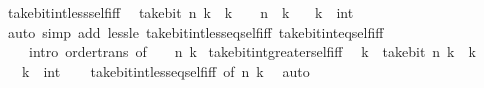 \begin{isabellebody}
\isamarkupfalse%
%
\endisatagproof
{\isafoldproof}%
%
\isadelimproof
\isanewline
%
\endisadelimproof
\isanewline
{}\isamarkupfalse%
\ take{\isacharunderscore}{\kern0pt}bit{\isacharunderscore}{\kern0pt}int{\isacharunderscore}{\kern0pt}less{\isacharunderscore}{\kern0pt}self{\isacharunderscore}{\kern0pt}iff{\isacharcolon}{\kern0pt}\isanewline
\ \ {\isacartoucheopen}take{\isacharunderscore}{\kern0pt}bit\ n\ k\ {\isacharless}{\kern0pt}\ k\ {\isasymlongleftrightarrow}\ {}\ {\isacharcircum}{\kern0pt}\ n\ {\isasymle}\ k{\isacartoucheclose}\isanewline
\ \ \ k\ {\isacharcolon}{\kern0pt}{\isacharcolon}{\kern0pt}\ int\isanewline
%
\isadelimproof
\ \ %
\endisadelimproof
%
\isatagproof
{}\isamarkupfalse%
\ {\isacharparenleft}{\kern0pt}auto\ simp\ add{\isacharcolon}{\kern0pt}\ less{\isacharunderscore}{\kern0pt}le\ take{\isacharunderscore}{\kern0pt}bit{\isacharunderscore}{\kern0pt}int{\isacharunderscore}{\kern0pt}less{\isacharunderscore}{\kern0pt}eq{\isacharunderscore}{\kern0pt}self{\isacharunderscore}{\kern0pt}iff\ take{\isacharunderscore}{\kern0pt}bit{\isacharunderscore}{\kern0pt}int{\isacharunderscore}{\kern0pt}eq{\isacharunderscore}{\kern0pt}self{\isacharunderscore}{\kern0pt}iff\isanewline
\ \ \ \ intro{\isacharcolon}{\kern0pt}\ order{\isacharunderscore}{\kern0pt}trans\ {\isacharbrackleft}{\kern0pt}of\ {}\ {\isacartoucheopen}{}\ {\isacharcircum}{\kern0pt}\ n{\isacartoucheclose}\ k{\isacharbrackright}{\kern0pt}{\isacharparenright}{\kern0pt}%
\endisatagproof
{\isafoldproof}%
%
\isadelimproof
\isanewline
%
\endisadelimproof
\isanewline
{}\isamarkupfalse%
\ take{\isacharunderscore}{\kern0pt}bit{\isacharunderscore}{\kern0pt}int{\isacharunderscore}{\kern0pt}greater{\isacharunderscore}{\kern0pt}self{\isacharunderscore}{\kern0pt}iff{\isacharcolon}{\kern0pt}\isanewline
\ \ {\isacartoucheopen}k\ {\isacharless}{\kern0pt}\ take{\isacharunderscore}{\kern0pt}bit\ n\ k\ {\isasymlongleftrightarrow}\ k\ {\isacharless}{\kern0pt}\ {}{\isacartoucheclose}\isanewline
\ \ \ k\ {\isacharcolon}{\kern0pt}{\isacharcolon}{\kern0pt}\ int\isanewline
%
\isadelimproof
\ \ %
\endisadelimproof
%
\isatagproof
{}\isamarkupfalse%
\ take{\isacharunderscore}{\kern0pt}bit{\isacharunderscore}{\kern0pt}int{\isacharunderscore}{\kern0pt}less{\isacharunderscore}{\kern0pt}eq{\isacharunderscore}{\kern0pt}self{\isacharunderscore}{\kern0pt}iff\ {\isacharbrackleft}{\kern0pt}of\ n\ k{\isacharbrackright}{\kern0pt}\ \isamarkupfalse%
\ auto%
\endisatagproof

\end{isabellebody}
